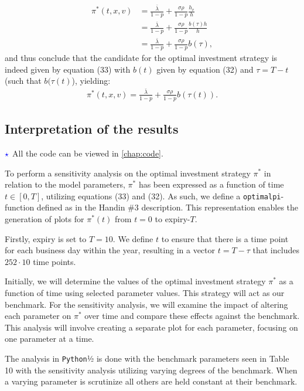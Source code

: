 \documentclass[11pt]{article}
\numberwithin{equation}{section}
\begin{document}
\begin{align*}
    \pi^*(t,x,v)&=\frac{\bar{\lambda}}{1-p}+\frac{\sigma \rho}{1-p}\frac{h_v}{h}\\
    &=\frac{\bar{\lambda}}{1-p}+\frac{\sigma \rho}{1-p}\frac{b(\tau)h}{h}\\
    &=\frac{\bar{\lambda}}{1-p}+\frac{\sigma \rho}{1-p}b(\tau),
\end{align*}
and thus conclude that the candidate for the optimal investment strategy
is indeed given by equation (33) with $b(t)$ given by equation (32) and
$\tau=T-t$ (such that $b(\tau(t)$), yielding:
\begin{align*}
    \pi^*(t,x,v)=\frac{\bar{\lambda}}{1-p}+\frac{\sigma \rho}{1-p}b(\tau(t)).
\end{align*}
\newpage
\subsection{Interpretation of the results}
$\textcolor{blue}{\star}$ All the code can be viewed in \autoref{chap:code}. 

To perform a sensitivity analysis on the optimal investment strategy $\pi^*$ in
relation to the model parameters, $\pi^*$ has been expressed as a function of
time $t\in [0,T]$, utilizing equations (33) and (32). As such, we define a
\texttt{optimalpi}-function defined as in the Handin \#3 description.  This representation enables the
generation of plots for $\pi^*(t)$ from $t=0$ to expiry-$T$.

Firstly, expiry is set to $T = 10$. We define $t$
to ensure that there is a time point for each business day within the year,
resulting in a vector $t = T - \tau$ that includes $252\cdot 10$ time points.

Initially, we will determine the values of the optimal investment strategy
$\pi^*$ as a function of time using selected parameter values. This strategy
will act as our benchmark. For the sensitivity analysis, we will examine the
impact of altering each parameter on $\pi^*$ over time and compare these effects
against the benchmark. This analysis will involve creating a separate plot for
each parameter, focusing on one parameter at a time.

The analysis in \texttt{Python}½ is done with the benchmark parameters seen in
Table 10 with the sensitivity analysis utilizing varying degrees of the
benchmark. When a varying parameter is scrutinize all others are held constant
at their benchmark.
\end{document}
